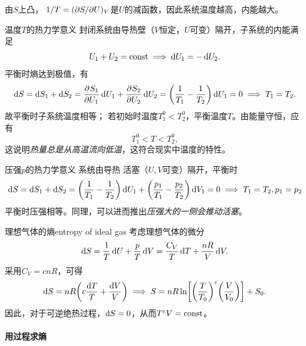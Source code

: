 

\begin{corollary}
	由$S$上凸，
	$1/T=(\partial S/\partial U)_V$是$U$的减函数，因此系统温度越高，内能越大。
\end{corollary}

\begin{example}
	{温度$T$的热力学意义}{}
	封闭系统由导热壁（$V$恒定，$U$可变）隔开，子系统的内能满足
	\[
		U_1+U_2=\text{const}\implies\mathop{}\!\mathrm{d} U_1=-\mathop{}\!\mathrm{d} U_2.
	\]
	平衡时熵达到极值，有
	\[
		\mathop{}\!\mathrm{d} S=\mathop{}\!\mathrm{d} S_1+\mathop{}\!\mathrm{d} S_2=\frac{\partial^{{}}S_1}{\partial{U_1}^{{}}}\mathop{}\!\mathrm{d} U_1+\frac{\partial^{{}}S_2}{\partial{U_2}^{{}}}\mathop{}\!\mathrm{d} U_2=\biggl(\frac1{T_1}-\frac1{T_2}\biggr)\mathop{}\!\mathrm{d} U_1=0\implies T_1=T_2.
	\]
	故平衡时子系统温度相等；
	若初始时温度$T_1^0<T_2^0$，平衡温度$T$。由能量守恒，应有
	\[
		T_1^0<T<T_2^0,
	\]
	这说明\textit{热量总是从高温流向低温}，这符合现实中温度的特性。
\end{example}

\begin{example}
	{压强$p$的热力学意义}{}
	系统由导热
	活塞（$U,V$可变）隔开，平衡时
	\[
		\mathop{}\!\mathrm{d} S=\mathop{}\!\mathrm{d} S_1+\mathop{}\!\mathrm{d} S_2=\biggl(\frac1{T_1}-\frac1{T_2}\biggr)\mathop{}\!\mathrm{d} U_1+\biggl(\frac{p_1}{T_1}-\frac{p_2}{T_2}\biggr)\mathop{}\!\mathrm{d} V_1=0\implies T_1=T_2,p_1=p_2
	\]
	平衡时压强相等。同理，可以进而推出\textit{压强大的一侧会推动活塞}。
\end{example}

\begin{example}
	{理想气体的熵}{entropy of ideal gas}
	考虑理想气体的微分
	\[
		\mathop{}\!\mathrm{d} S=\frac1T\mathop{}\!\mathrm{d} U+\frac pT\mathop{}\!\mathrm{d} V=\frac{C_V}T\mathop{}\!\mathrm{d} T+\frac{nR}V\mathop{}\!\mathrm{d} V.
	\]
	采用$C_V=cnR$，可得
	\[
		\mathop{}\!\mathrm{d} S=nR\biggl(c\frac{\mathop{}\!\mathrm{d} T}T+\frac{\mathop{}\!\mathrm{d} V}V\biggr)\implies S=nR\ln\biggl[\biggl(\frac{T}{T_0}\biggr)^c\biggl(\frac{V}{V_0}\biggr)\biggr]+S_0.
	\]
	因此，对于可逆绝热过程，$\mathop{}\!\mathrm{d} S=0$，从而$T^cV=\text{const}$。	
\end{example}

\paragraph{用过程求熵}


